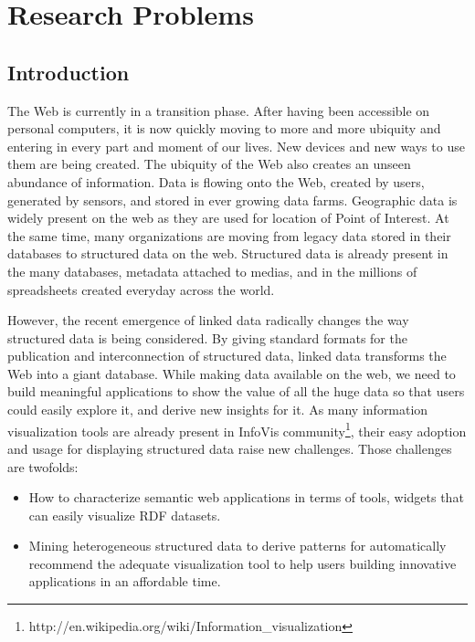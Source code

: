 \documentclass[a4paper,11pt]{report}
\begin{document}


\chapter{Research Problems}

\section{Introduction}
The Web is currently in a transition phase. After having been accessible on personal computers, it is now 
quickly moving to more and more ubiquity and entering in every part and moment of our lives. New 
devices and new ways to use them are being created. The ubiquity of the Web also creates an unseen 
abundance of information. Data is flowing onto the Web, created by users, generated by sensors, and 
stored in ever growing data farms. Geographic data is widely present on the web as they are used for location 
of Point of Interest. At the same time, many organizations are moving from legacy data stored in their databases
to structured data on the web. Structured data is already present in the many databases, metadata attached to medias, and in the millions of spreadsheets created everyday across the world. 

However, the recent emergence of linked data radically changes the way structured data is being considered. By giving standard formats for the publication and interconnection of structured data, linked data transforms the Web into a giant database. While making data available on the web, we need to build meaningful applications to show the value of all the huge data so that users could easily explore it, and derive new insights for it. As many information visualization tools are already present in InfoVis community\footnote{http://en.wikipedia.org/wiki/Information\_visualization}, their easy adoption and usage for displaying structured data raise new challenges. Those challenges are twofolds:
\begin{itemize}
\item How to characterize semantic web applications in terms of tools, widgets that can easily visualize RDF datasets.
\item Mining heterogeneous structured data to derive patterns for automatically recommend the adequate visualization tool to help users building innovative applications in an affordable time.
\end{itemize}
\end{document}
